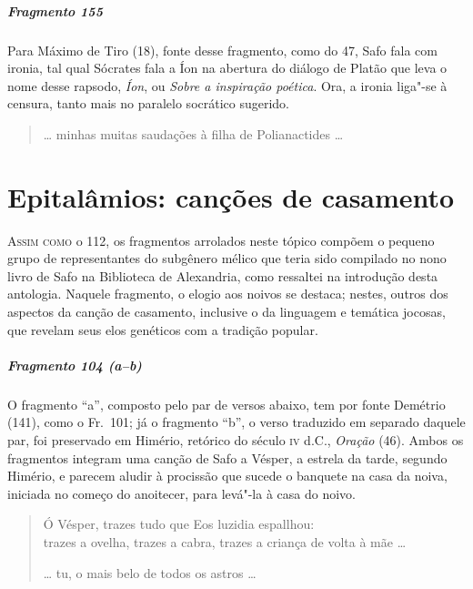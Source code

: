 \paragraph{Fragmento 155}

{\small Para Máximo de Tiro (18), fonte desse fragmento, como do 47, Safo fala com ironia, tal qual
Sócrates fala a Íon na abertura do diálogo de Platão que leva o nome desse
rapsodo, \textit{Íon}, ou \textit{Sobre a inspiração poética}. Ora, a ironia
liga"-se à censura, tanto mais no paralelo socrático sugerido.}

\begin{verse}
\ldots{} minhas muitas saudações à filha de \qb{}Polianactides \ldots{}
\end{verse}


\chapter[Epitalâmios: canções de casamento]{Epitalâmios: canções de casamento}

\textsc{Assim como} o 112, os fragmentos arrolados neste tópico compõem o pequeno grupo
de representantes do subgênero mélico que teria sido compilado no nono livro de
Safo na Biblioteca de Alexandria, como ressaltei na introdução desta antologia.
Naquele fragmento, o elogio aos noivos se destaca; nestes, outros dos aspectos
da canção de casamento, inclusive o da linguagem e temática jocosas, que
revelam seus elos genéticos com a tradição popular.

\paragraph{Fragmento 104 (a--b)}

{\small O fragmento “a”, composto pelo par de versos abaixo, tem por fonte Demétrio (141),
como o Fr.~101; já o fragmento “b”, o verso traduzido em separado daquele par,
foi preservado em Himério, retórico do século \textsc{iv} d.C., \textit{Oração} (46).
Ambos os fragmentos integram uma canção de Safo a Vésper, a estrela da tarde,
segundo Himério, e parecem aludir à procissão que sucede o banquete na casa da
noiva, iniciada no começo do anoitecer, para levá"-la à casa do noivo.}

\begin{verse}
Ó Vésper, trazes tudo que Eos luzidia \qb{}espallhou:\\ %
trazes a ovelha, trazes a cabra, trazes a \qb{}criança de volta à mãe \ldots{}

\ldots{} tu, o mais belo de todos os astros \ldots{} 
\end{verse}


